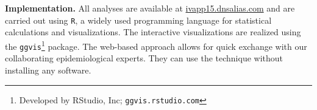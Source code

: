 \documentclass[a4paper,twoside]{style/article}
\begin{document}
\\\\
\noindent \textbf{Implementation.}
All analyses are available at \url{ivapp15.dnsalias.com} and are carried out using \texttt{R}, a widely used programming language for statistical calculations and visualizations.
The interactive visualizations are realized using the \texttt{ggvis}\footnote{Developed by RStudio, Inc; \texttt{ggvis.rstudio.com}} package.
The web-based approach allows for quick exchange with our collaborating epidemiological experts.
They can use the technique without installing any software.
\end{document}
